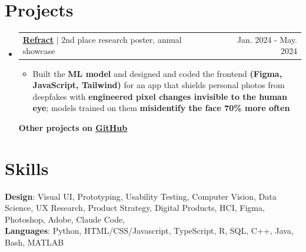 \documentclass[letterpaper,11pt]{article}
\makeatletter
\newcommand{\resumeItem}[1]{
  \item\small{
    {#1 \vspace{-3pt}}
  }
}
\newcommand{\resumeProjectHeading}[2]{
    \vspace{-5pt}\item
    \begin{tabular*}{0.97\textwidth}{l@{\extracolsep{\fill}}r}
      \small#1 & #2 \\
    \end{tabular*}\vspace{-2pt}
}
\newcommand{\resumeSubHeadingListStart}{\begin{itemize}[leftmargin=0in, label={}]}
\newcommand{\resumeSubHeadingListEnd}{\end{itemize}\vspace{-5pt}}
\newcommand{\resumeItemListStart}{\begin{itemize}}
\newcommand{\resumeProjectItemListEnd}{\end{itemize}\vspace{5pt}}
\makeatother
\begin{document}
\section{Projects}
\resumeSubHeadingListStart
\resumeProjectHeading
{\textbf{\href{https://github.com/heyyysus/refract}{\underline{Refract}}} $|$ 2nd place research poster, annual showcase}{Jan. 2024 - May. 2024}
\resumeItemListStart
\resumeItem{Built the \textbf{ML model} and designed and coded the frontend \textbf{(Figma, JavaScript, Tailwind)} for an app that shields personal photos from deepfakes with \textbf{engineered pixel changes invisible to the human eye}; models trained on them \textbf{misidentify the face 70\% more often}}
\resumeProjectItemListEnd

{\textbf{Other projects on \href{https://github.com/qwistaycat?tab=repositories}{\underline{GitHub}}}}{}

\resumeSubHeadingListEnd

\section{Skills}
\begin{itemize}[leftmargin=0.15in, label={}]
  \small{\item{
        \textbf{Design}{: Visual UI, Prototyping, Usability Testing, Computer Vision, Data Science, UX Research, Product Strategy, Digital Products, HCI, Figma, Photoshop, Adobe, Claude Code,  } \\
        \textbf{Languages}{: Python, HTML/CSS/Javascript, TypeScript, R, SQL, C++, Java, Bash, MATLAB}
        }}
\end{itemize}
\end{document}
